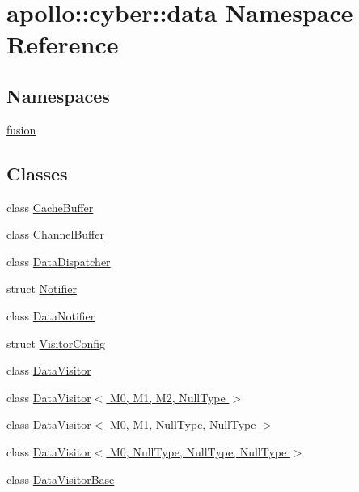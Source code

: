 \hypertarget{namespaceapollo_1_1cyber_1_1data}{\section{apollo\-:\-:cyber\-:\-:data Namespace Reference}
\label{namespaceapollo_1_1cyber_1_1data}
}
\subsection*{Namespaces}
\begin{DoxyCompactItemize}
\item 
\hyperlink{namespaceapollo_1_1cyber_1_1data_1_1fusion}{fusion}
\end{DoxyCompactItemize}
\subsection*{Classes}
\begin{DoxyCompactItemize}
\item 
class \hyperlink{classapollo_1_1cyber_1_1data_1_1CacheBuffer}{Cache\-Buffer}
\item 
class \hyperlink{classapollo_1_1cyber_1_1data_1_1ChannelBuffer}{Channel\-Buffer}
\item 
class \hyperlink{classapollo_1_1cyber_1_1data_1_1DataDispatcher}{Data\-Dispatcher}
\item 
struct \hyperlink{structapollo_1_1cyber_1_1data_1_1Notifier}{Notifier}
\item 
class \hyperlink{classapollo_1_1cyber_1_1data_1_1DataNotifier}{Data\-Notifier}
\item 
struct \hyperlink{structapollo_1_1cyber_1_1data_1_1VisitorConfig}{Visitor\-Config}
\item 
class \hyperlink{classapollo_1_1cyber_1_1data_1_1DataVisitor}{Data\-Visitor}
\item 
class \hyperlink{classapollo_1_1cyber_1_1data_1_1DataVisitor_3_01M0_00_01M1_00_01M2_00_01NullType_01_4}{Data\-Visitor$<$ M0, M1, M2, Null\-Type $>$}
\item 
class \hyperlink{classapollo_1_1cyber_1_1data_1_1DataVisitor_3_01M0_00_01M1_00_01NullType_00_01NullType_01_4}{Data\-Visitor$<$ M0, M1, Null\-Type, Null\-Type $>$}
\item 
class \hyperlink{classapollo_1_1cyber_1_1data_1_1DataVisitor_3_01M0_00_01NullType_00_01NullType_00_01NullType_01_4}{Data\-Visitor$<$ M0, Null\-Type, Null\-Type, Null\-Type $>$}
\item 
class \hyperlink{classapollo_1_1cyber_1_1data_1_1DataVisitorBase}{Data\-Visitor\-Base}
\end{DoxyCompactItemize}
